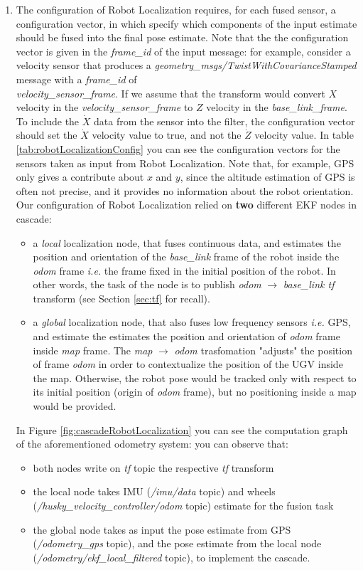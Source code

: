 \begin{enumerate}
	\item The configuration of Robot Localization requires, for each fused sensor, a configuration vector, in which specify which components of the input estimate should be fused into the final pose estimate. Note that the the configuration vector is given in the \textit{frame\_id} of the input message: for example, consider a velocity sensor that produces a \textit{geometry\_msgs/TwistWithCovarianceStamped} message with a \textit{frame\_id} of \\ \textit{velocity\_sensor\_frame}. If we assume that the transform would convert $X$ velocity in the \textit{velocity\_sensor\_frame} to $Z$ velocity in the \textit{base\_link\_frame}. To include the $\dot{X}$ data from the sensor into the filter, the configuration vector should set the $\dot{X}$ velocity value to true, and not the $\dot{Z}$ velocity value. In table \ref{tab:robotLocalizationConfig} you can see the configuration vectors for the sensors taken as input from Robot Localization. Note that, for example, GPS only gives a contribute about $x$ and $y$, since the altitude estimation of GPS is often not precise, and it provides no information about the robot orientation. Our configuration of Robot Localization relied on \textbf{two} different \ac{EKF} nodes in cascade:
	\begin{itemize}
		\item a \textit{local} localization node, that fuses continuous data, and estimates the position and orientation of the \textit{base\_link} frame of the robot inside the \textit{odom} frame \textit{i.e.} the frame fixed in the initial position of the robot. In other words, the task of the node is to publish \textit{odom} $\rightarrow$ \textit{base\_link tf} transform (see Section \ref{sec:tf} for recall). 
		\item a \textit{global} localization node, that also fuses low frequency sensors \textit{i.e.} GPS, and estimate the estimates the position and orientation of \textit{odom} frame inside \textit{map} frame. The \textit{map} $\rightarrow$ \textit{odom} trasfomation "adjusts" the position of frame \textit{odom} in order to contextualize the position of the \ac{UGV} inside the map. Otherwise, the robot pose would be tracked only with respect to its initial position (origin of \textit{odom} frame), but no positioning inside a map would be provided.
 	\end{itemize}
In Figure \ref{fig:cascadeRobotLocalization} you can see the computation graph of the aforementioned odometry system: you can observe that:
	\begin{itemize}
		\item both nodes write on \textit{tf} topic the respective \textit{tf} transform
		\item the local node takes \ac{IMU} (\textit{/imu/data} topic) and wheels (\textit{/husky\_velocity\_controller/odom} topic) estimate for the fusion task
		\item the global node takes as input the pose estimate from GPS (\textit{/odometry\_gps} topic), and the pose estimate from the local node (\textit{/odometry/ekf\_local\_filtered} topic), to implement the cascade.
	\end{itemize}


\end{enumerate}
